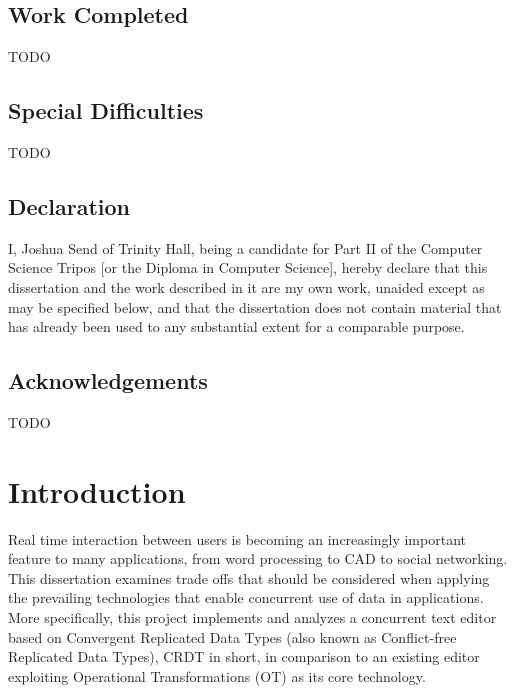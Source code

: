 \documentclass[12pt,a4paper,twoside,openright]{report}
\begin{document}
\section*{Work Completed}

TODO

\section*{Special Difficulties}

TODO
 
\newpage
\section*{Declaration}

I, Joshua Send of Trinity Hall, being a candidate for Part II of the Computer
Science Tripos [or the Diploma in Computer Science], hereby declare
that this dissertation and the work described in it are my own work,
unaided except as may be specified below, and that the dissertation
does not contain material that has already been used to any substantial
extent for a comparable purpose.

\bigskip
{}

\medskip
{}

\tableofcontents

\listoffigures

\newpage
\section*{Acknowledgements}

TODO


\pagestyle{headings}

\chapter{Introduction}

Real time interaction between users is becoming an increasingly important feature to many applications, from word processing to CAD to social networking. This dissertation examines trade offs that should be considered when applying the prevailing technologies that enable concurrent use of data in applications. More specifically, this project implements and analyzes a concurrent text editor based on Convergent Replicated Data Types (also known as Conflict-free Replicated Data Types), CRDT in short, in comparison to an existing editor exploiting Operational Transformations (OT) as its core technology.
\end{document}
